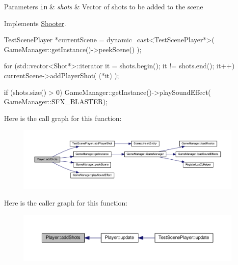 \begin{DoxyParams}[1]{Parameters}
\mbox{\tt in}  & {\em shots} & Vector of shots to be added to the scene \\
\hline
\end{DoxyParams}


Implements \hyperlink{class_shooter_ac632e56f3cc571f6d140767ba33053e8}{Shooter}.


\begin{DoxyCode}
{
        TestScenePlayer *currentScene = dynamic_cast<TestScenePlayer*>( 
      GameManager::getInstance()->peekScene() );

        for (std::vector<Shot*>::iterator it = shots.begin(); it != shots.end(); 
      it++)
        {
                currentScene->addPlayerShot( (*it) );
        }

        if (shots.size() > 0)
        {
                GameManager::getInstance()->playSoundEffect(
      GameManager::SFX_BLASTER);
        }
}
\end{DoxyCode}


Here is the call graph for this function:
\nopagebreak
\begin{figure}[H]
\begin{center}
\leavevmode
\includegraphics[width=400pt]{d8/d53/class_player_a47ca4197c52a2ee0952abddd519d8506_cgraph}
\end{center}
\end{figure}




Here is the caller graph for this function:
\nopagebreak
\begin{figure}[H]
\begin{center}
\leavevmode
\includegraphics[width=400pt]{d8/d53/class_player_a47ca4197c52a2ee0952abddd519d8506_icgraph}
\end{center}
\end{figure}


